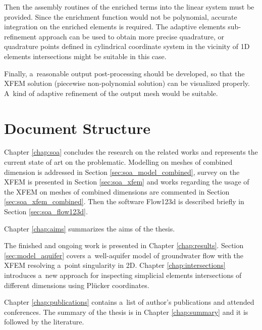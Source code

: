 Then the assembly routines of the enriched terms into the linear system must be provided.
Since the enrichment function would not be polynomial, accurate integration on the enriched elements is required. 
The adaptive elements sub-refinement approach can be used to obtain more precise quadrature, 
or quadrature points defined in cylindrical coordinate system in the vicinity of 1D elements intersections
might be suitable in this case.

Finally, a~reasonable output post-processing should be developed, so that the XFEM solution (piecewise non-polynomial solution)
can be visualized properly. A~kind of adaptive refinement of the output mesh would be suitable.


\section{Document Structure} \label{sec:structure}

Chapter \ref{chap:soa} concludes the research on the related works and represents the current state of art
on the problematic. Modelling on meshes of combined dimension is addressed in Section \ref{sec:soa_model_combined},
survey on the XFEM is presented in Section \ref{sec:soa_xfem} and works regarding the usage of the XFEM on
meshes of combined dimensions are commented in Section \ref{sec:soa_xfem_combined}. Then 
the software Flow123d is described briefly in Section \ref{sec:soa_flow123d}.

Chapter \ref{chap:aims} summarizes the aims of the thesis.

The finished and ongoing work is presented in Chapter \ref{chap:results}. Section \ref{sec:model_aquifer} 
covers a~well-aquifer model of groundwater flow with the XFEM resolving a~point singularity in 2D.
Chapter \ref{chap:intersections} introduces a~new approach for inspecting simplicial elements intersections
of different dimensions using Pl{\"u}cker coordinates.

Chapter \ref{chap:publications} contains a~list of author's publications and attended conferences.
The summary of the thesis is in Chapter \ref{chap:summary} and it is followed by the literature.
